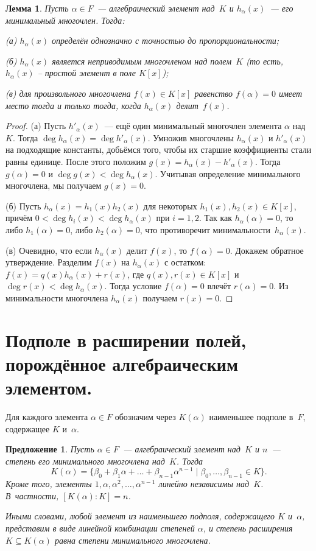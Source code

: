 \documentclass[a4paper, 12pt]{article}
\newtheorem{proposition}{Предложение}
\newtheorem{lemma}{Лемма}
\theoremstyle{definition}
\theoremstyle{remark}
\begin{document}
\begin{lemma} \label{lemma_min_pol}
Пусть $\alpha \in F$~--- алгебраический элемент над~$K$ и
$h_\alpha(x)$~--- его минимальный многочлен. Тогда:

\textup{(а)} $h_\alpha(x)$ определён однозначно с точностью до
пропорциональности;

\textup{(б)} $h_\alpha(x)$ является неприводимым многочленом над
полем~$K$ (то есть, $h_\alpha(x)$ -- простой элемент в поле $K[x]$);

\textup{(в)} для произвольного многочлена $f(x)\in K[x]$ равенство
$f(\alpha)=0$ имеет место тогда и только тогда, когда $h_\alpha(x)$
делит~$f(x)$.
\end{lemma}

\begin{proof}
(а) Пусть $h'_\alpha(x)$~--- ещё один минимальный многочлен элемента
$\alpha$ над~$K$. Тогда $\deg h_\alpha(x) = \deg h'_\alpha(x)$.
Умножив многочлены $h_\alpha(x)$ и $h'_\alpha(x)$ на подходящие
константы, добьёмся того, чтобы их старшие коэффициенты стали равны
единице. После этого положим $g(x) = h_\alpha(x) - h'_\alpha(x)$.
Тогда $g(\alpha) = 0$ и $\deg g(x) < \deg h_\alpha(x)$. Учитывая
определение минимального многочлена, мы получаем $g(x) = 0$.

(б) Пусть $h_\alpha(x) = h_1(x) h_2(x)$ для некоторых $h_1(x),
h_2(x) \in K[x]$, причём $0 < \deg h_i(x) < \deg h_\alpha(x)$ при $i
= 1,2$. Так как $h_\alpha(\alpha) = 0$, то либо $h_1(\alpha)=0$,
либо $h_2(\alpha)=0$, что противоречит минимальности~$h_\alpha(x)$.

(в) Очевидно, что если $h_\alpha(x)$ делит $f(x)$, то $f(\alpha) =
0$. Докажем обратное утверждение. Разделим $f(x)$ на $h_\alpha(x)$ с
остатком: $f(x) = q(x)h_\alpha(x) + r(x)$, где $q(x), r(x) \in K[x]$
и $\deg r(x) < \deg h_\alpha(x)$. Тогда условие $f(\alpha)=0$ влечёт
$r(\alpha) = 0$. Из минимальности многочлена $h_\alpha(x)$ получаем
$r(x)=0$.
\end{proof}


\section{Подполе в расширении полей, порождённое алгебраическим элементом.}

Для каждого элемента $\alpha \in F$ обозначим через $K(\alpha)$
наименьшее подполе в~$F$, содержащее $K$ и~$\alpha$.

\begin{proposition}
Пусть $\alpha \in F$~--- алгебраический элемент над~$K$ и $n$~---
степень его минимального многочлена над~$K$. Тогда
$$
K(\alpha) = \{\beta_0 + \beta_1 \alpha + \ldots + \beta_{n-1}
\alpha^{n-1} \mid \beta_0, \ldots, \beta_{n-1} \in K\}.
$$
Кроме того, элементы $1, \alpha, \alpha^2, \ldots, \alpha^{n-1}$
линейно независимы над~$K$. В~частности, $[K(\alpha) : K] = n$.

Иными словами, любой элемент из наименьшего подполя, содержащего $K$ и~$\alpha$, представим в виде линейной комбинации степеней $\alpha$, и степень расширения $K \subseteq K(\alpha)$ равна степени минимального многочлена.
\end{proposition}
\end{document}
